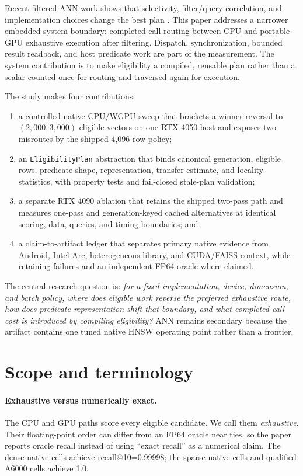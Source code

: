 \documentclass[10pt]{article}
\begin{document}
Recent filtered-ANN work shows that selectivity, filter/query correlation, and implementation choices change the best plan \citep{gollapudi2023filtered,patel2024acorn,iff2026fanns,shi2025unified,amanbayev2026systems}. This paper addresses a narrower embedded-system boundary: completed-call routing between CPU and portable-GPU exhaustive execution after filtering. Dispatch, synchronization, bounded result readback, and host predicate work are part of the measurement. The system contribution is to make eligibility a compiled, reusable plan rather than a scalar counted once for routing and traversed again for execution.

The study makes four contributions:
\begin{enumerate}
\item a controlled native CPU/WGPU sweep that brackets a winner reversal to \((2{,}000,3{,}000)\) eligible vectors on one RTX 4050 host and exposes two misroutes by the shipped 4,096-row policy;
\item an \texttt{EligibilityPlan} abstraction that binds canonical generation, eligible rows, predicate shape, representation, transfer estimate, and locality statistics, with property tests and fail-closed stale-plan validation;
\item a separate RTX 4090 ablation that retains the shipped two-pass path and measures one-pass and generation-keyed cached alternatives at identical scoring, data, queries, and timing boundaries; and
\item a claim-to-artifact ledger that separates primary native evidence from Android, Intel Arc, heterogeneous library, and CUDA/FAISS context, while retaining failures and an independent FP64 oracle where claimed.
\end{enumerate}

The central research question is: \emph{for a fixed implementation, device, dimension, and batch policy, where does eligible work reverse the preferred exhaustive route, how does predicate representation shift that boundary, and what completed-call cost is introduced by compiling eligibility?} ANN remains secondary because the artifact contains one tuned native HNSW operating point rather than a frontier.

\section{Scope and terminology}
\paragraph{Exhaustive versus numerically exact.}
The CPU and GPU paths score every eligible candidate. We call them \emph{exhaustive}. Their floating-point order can differ from an FP64 oracle near ties, so the paper reports oracle recall instead of using ``exact recall'' as a numerical claim. The dense native cells achieve recall@10=0.99998; the sparse native cells and qualified A6000 cells achieve 1.0.
\end{document}
